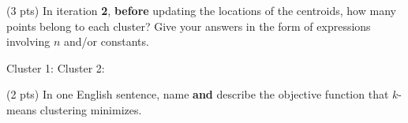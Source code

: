 \documentclass[twoside,12pt]{article}
\begin{document}
\begin{probset}
\begin{prob}[(11 pts)]
\begin{subprobset}
\begin{subprob}
\end{subprob}

\begin{subprob}(3 pts) In iteration \textbf{2}, \textbf{before} updating the locations of the centroids, how many points belong to each cluster? Give your answers in the form of expressions involving $n$ and/or constants.

Cluster 1: \inlineresponsebox[1.75in]{} \hspace{0.5in} Cluster 2: \inlineresponsebox[1.75in]{}

\end{subprob}

\begin{subprob}(2 pts) In one English sentence, name \textbf{and} describe the objective function that $k$-means clustering minimizes.

\begin{responsebox}{1.5in}
    
\end{responsebox}
    
\end{subprob}



    
    
\end{subprobset}





\end{prob}
\end{probset}
\end{document}
